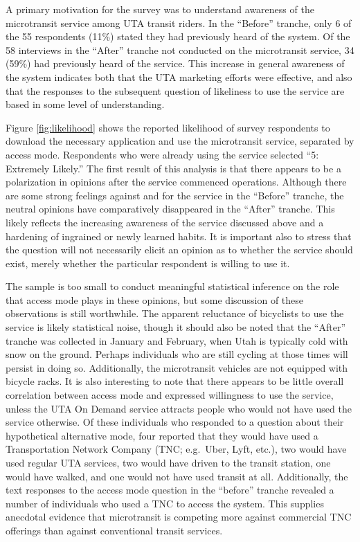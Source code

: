 \documentclass[smartcities,article,submit,moreauthors,pdftex]{mdpi}
\begin{document}
A primary motivation for the survey was to understand awareness of the
microtransit service among UTA transit riders. In the ``Before'' tranche, only 6
of the 55 respondents (11\%) stated they had previously heard of the system. Of
the 58 interviews in the ``After'' tranche not conducted on the microtransit
service, 34 (59\%) had previously heard of the service. This increase in general
awareness of the system indicates both that the UTA marketing efforts were
effective, and also that the responses to the subsequent question of likeliness
to use the service are based in some level of understanding.

Figure \ref{fig:likelihood} shows the reported likelihood of survey respondents
to download the necessary application and use the microtransit service,
separated by access mode. Respondents who were already using the service
selected ``5: Extremely Likely.'' The first result of this analysis is that there
appears to be a polarization in opinions after the service commenced operations.
Although there are some strong feelings against and for the service in the
``Before'' tranche, the neutral opinions have comparatively disappeared in the
``After'' tranche. This likely reflects the increasing awareness of the service
discussed above and a hardening of ingrained or newly learned habits. It is
important also to stress that the question will not necessarily elicit an
opinion as to whether the service should exist, merely whether the particular
respondent is willing to use it.

The sample is too small to conduct meaningful statistical inference on the role
that access mode plays in these opinions, but some discussion of these
observations is still worthwhile. The apparent reluctance of bicyclists to use
the service is likely statistical noise, though it should also be noted that the
``After'' tranche was collected in January and February, when Utah is typically
cold with snow on the ground. Perhaps individuals who are still cycling at those
times will persist in doing so. Additionally, the microtransit vehicles are not
equipped with bicycle racks. It is also interesting to note that there
appears to be little overall correlation between access mode and expressed
willingness to use the service, unless the UTA On Demand service attracts people
who would not have used the service otherwise. Of these individuals who
responded to a question about their hypothetical alternative mode, four reported
that they would have used a Transportation Network Company (TNC; e.g.~Uber,
Lyft, etc.), two would have used regular UTA services, two would have driven to
the transit station, one would have walked, and one would not have used transit
at all. Additionally, the text responses to the access mode question in the
``before'' tranche revealed a number of individuals who used a TNC to access the
system. This supplies anecdotal evidence that microtransit is competing more
against commercial TNC offerings than against conventional transit services.
\end{document}
